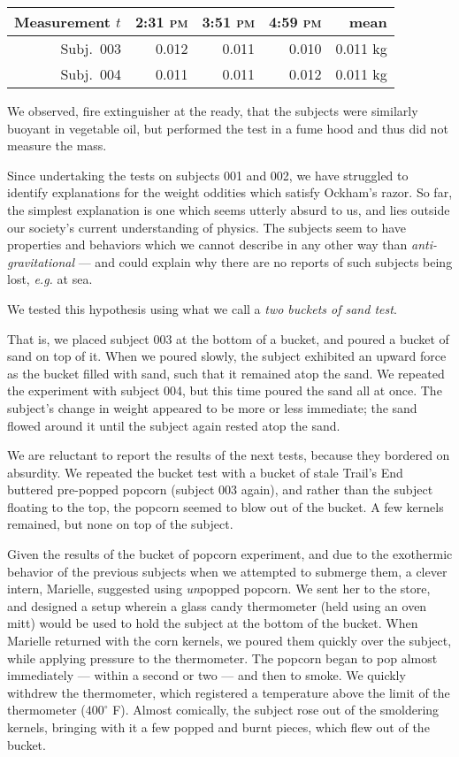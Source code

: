 \documentclass[10pt]{article}
\begin{document}
\begin{tabular}[h]{r|rrr|r}
Measurement $t$ & 2:31 \textsc{pm} & 3:51 \textsc{pm} & 4:59 \textsc{pm} & mean \\
\hline
Subj.~003 & 0.012 & 0.011 & 0.010 & 0.011 kg \\
Subj.~004 & 0.011 & 0.011 & 0.012 & 0.011 kg \\
\hline
\end{tabular}

We observed, fire extinguisher at the ready, that the subjects were similarly buoyant in vegetable oil, but performed the test in a fume hood and thus did not measure the mass.

Since undertaking the tests on subjects 001 and 002, we have struggled to identify explanations for the weight oddities which satisfy Ockham's razor.
So far, the simplest explanation is one which seems utterly absurd to us, and lies outside our society's current understanding of physics.
The subjects seem to have properties and behaviors which we cannot describe in any other way than \textit{anti-gravitational} --- and could explain why there are no reports of such subjects being lost, \textit{e.g.} at sea.

We tested this hypothesis using what we call a \textit{two buckets of sand test}.

That is, we placed subject 003 at the bottom of a bucket, and poured a bucket of sand on top of it.
When we poured slowly, the subject exhibited an upward force as the bucket filled with sand, such that it remained atop the sand.
We repeated the experiment with subject 004, but this time poured the sand all at once.
The subject's change in weight appeared to be more or less immediate; the sand flowed around it until the subject again rested atop the sand.

We are reluctant to report the results of the next tests, because they bordered on absurdity.
We repeated the bucket test with a bucket of stale Trail's End buttered pre-popped popcorn (subject 003 again), and rather than the subject floating to the top, the popcorn seemed to blow out of the bucket.
A few kernels remained, but none on top of the subject.

Given the results of the bucket of popcorn experiment, and due to the exothermic behavior of the previous subjects when we attempted to submerge them, a clever intern, Marielle, suggested using \textit{un}popped popcorn.
We sent her to the store, and designed a setup wherein a glass candy thermometer (held using an oven mitt) would be used to hold the subject at the bottom of the bucket.
When Marielle returned with the corn kernels, we poured them quickly over the subject, while applying pressure to the thermometer.
The popcorn began to pop almost immediately --- within a second or two --- and then to smoke.
We quickly withdrew the thermometer, which registered a temperature above the limit of the thermometer ($400^\circ$ F).
Almost comically, the subject rose out of the smoldering kernels, bringing with it a few popped and burnt pieces, which flew out of the bucket.
\end{document}
